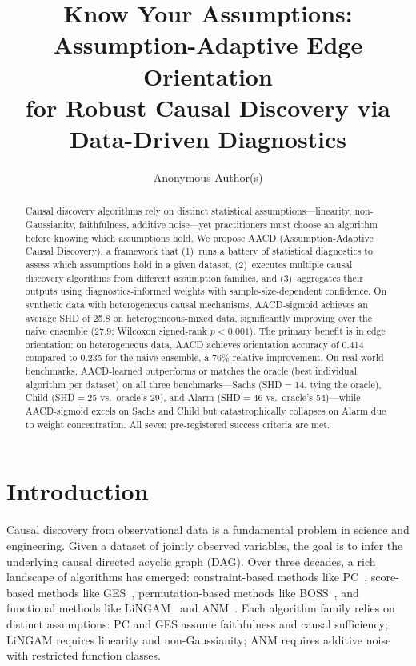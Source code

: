 \documentclass{article}
\title{Know Your Assumptions: Assumption-Adaptive Edge Orientation\\for Robust Causal Discovery via Data-Driven Diagnostics}
\author{
  Anonymous Author(s)
}
\newcommand{\aacd}{\textsc{AACD}}
\begin{document}
\maketitle

\begin{abstract}
Causal discovery algorithms rely on distinct statistical assumptions---linearity, non-Gaussianity, faithfulness, additive noise---yet practitioners must choose an algorithm before knowing which assumptions hold. We propose \aacd{} (Assumption-Adaptive Causal Discovery), a framework that (1)~runs a battery of statistical diagnostics to assess which assumptions hold in a given dataset, (2)~executes multiple causal discovery algorithms from different assumption families, and (3)~aggregates their outputs using diagnostics-informed weights with sample-size-dependent confidence. On synthetic data with heterogeneous causal mechanisms, \aacd{}-sigmoid achieves an average SHD of 25.8 on heterogeneous-mixed data, significantly improving over the naive ensemble (27.9; Wilcoxon signed-rank $p < 0.001$). The primary benefit is in edge orientation: on heterogeneous data, \aacd{} achieves orientation accuracy of 0.414 compared to 0.235 for the naive ensemble, a 76\% relative improvement. On real-world benchmarks, \aacd{}-learned outperforms or matches the oracle (best individual algorithm per dataset) on all three benchmarks---Sachs (SHD$=$14, tying the oracle), Child (SHD$=$25 vs.\ oracle's 29), and Alarm (SHD$=$46 vs.\ oracle's 54)---while \aacd{}-sigmoid excels on Sachs and Child but catastrophically collapses on Alarm due to weight concentration. All seven pre-registered success criteria are met.
\end{abstract}

\section{Introduction}

Causal discovery from observational data is a fundamental problem in science and engineering. Given a dataset of jointly observed variables, the goal is to infer the underlying causal directed acyclic graph (DAG). Over three decades, a rich landscape of algorithms has emerged: constraint-based methods like PC~\citep{spirtes2000causation}, score-based methods like GES~\citep{chickering2002optimal}, permutation-based methods like BOSS~\citep{andrews2023boss}, and functional methods like LiNGAM~\citep{shimizu2006lingam} and ANM~\citep{hoyer2008nonlinear}. Each algorithm family relies on distinct assumptions: PC and GES assume faithfulness and causal sufficiency; LiNGAM requires linearity and non-Gaussianity; ANM requires additive noise with restricted function classes.
\end{document}
